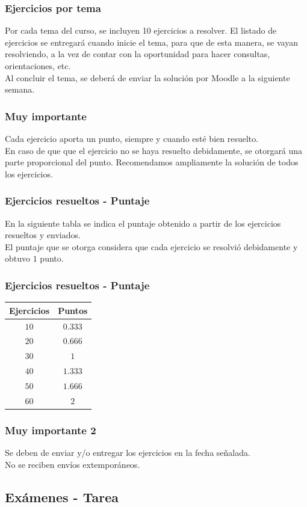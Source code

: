 \documentclass[12pt]{beamer}
\begin{document}
\begin{frame}
\frametitle{Ejercicios por tema}
Por cada tema del curso, se incluyen 10 ejercicios a resolver. El listado de ejercicios se entregará cuando inicie el tema, para que de esta manera, se vayan resolviendo, a la vez de contar con la oportunidad para hacer consultas, orientaciones, etc.
\\
\bigskip
\pause
Al concluir el tema, se deberá de enviar la solución por Moodle a la siguiente semana.
\end{frame}
\begin{frame}
\frametitle{Muy importante}
Cada ejercicio aporta un punto, siempre y cuando esté bien resuelto.
\\
\bigskip
\pause
En caso de que que el ejercicio no se haya resuelto debidamente, se otorgará una parte proporcional del punto. \pause Recomendamos ampliamente la solución de todos los ejercicios.
\end{frame}
\begin{frame}
\frametitle{Ejercicios resueltos - Puntaje}
En la siguiente tabla se indica el puntaje obtenido a partir de los ejercicios resueltos y enviados.
\\
\bigskip
\pause
El puntaje que se otorga considera que cada ejercicio se resolvió debidamente y obtuvo $1$ punto.
\end{frame}
\begin{frame}
\frametitle{Ejercicios resueltos - Puntaje}
\begin{table}
\centering
\renewcommand{\arraystretch}{1.1}
\begin{tabular}{c | c}
Ejercicios & Puntos \\ \hline
$10$ & $0.333$  \\ \hline
$20$ & $0.666$ \\ \hline
$30$ & $1$ \\ \hline
$40$ & $1.333$ \\ \hline
$50$ & $1.666$ \\ \hline
$60$ & $2$ \\ \hline
\end{tabular}
\end{table}
\end{frame}
\begin{frame}
\frametitle{Muy importante 2}
Se deben de enviar y/o entregar los ejercicios en la fecha señalada.
\\
\bigskip
\pause
No se reciben envíos extemporáneos.
\end{frame}

\subsection{Exámenes - Tarea}
\end{document}
